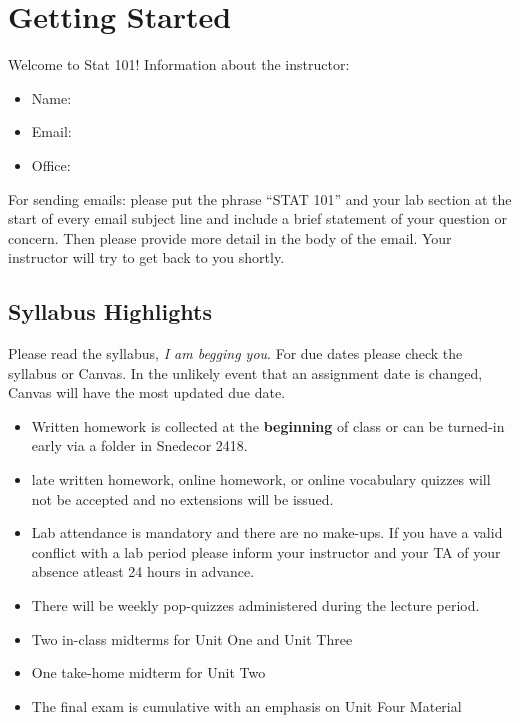 \documentclass[12pt]{article}
\theoremstyle{nonumberplain}
\begin{document}

\lhead{\today}

\section*{Getting Started}

Welcome to Stat 101! Information about the instructor: 

\begin{itemize}

\item Name: 

\item Email: 

\item Office: 

\end{itemize}


For sending emails: please put the phrase ``STAT 101'' and your lab section at the start of every email subject line and include a brief statement of your question or concern. Then please provide more detail in the body of the email. Your instructor will try to get back to you shortly. 

\subsection*{Syllabus Highlights}

Please read the syllabus, \textit{I am begging you}. For due dates please check the syllabus or Canvas. In the unlikely event that an assignment date is changed, Canvas will have the most updated due date. 

\begin{itemize}
\item Written homework is collected at the \textbf{beginning} of class or can be turned-in early via a folder in Snedecor 2418.
\item late written homework, online homework, or online vocabulary quizzes will not be accepted and no extensions will be issued. 
\item Lab attendance is mandatory and there are no make-ups. If you have a valid conflict with a lab period please inform your instructor and your TA of your absence atleast 24 hours in advance. 
\item There will be weekly pop-quizzes administered during the lecture period.
\item Two in-class midterms for Unit One and Unit Three
\item One take-home midterm for Unit Two
\item The final exam is cumulative with an emphasis on Unit Four Material
\end{itemize}
\end{document}
